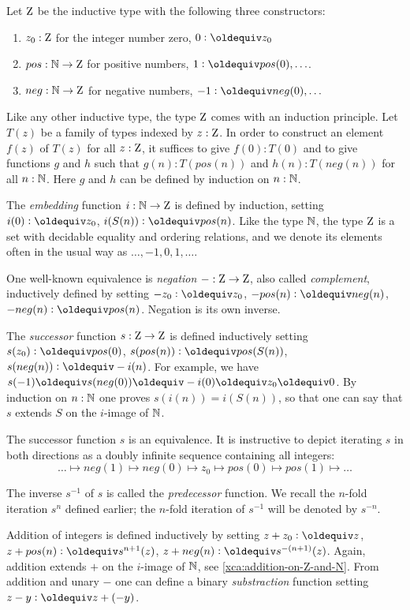 \begin{definition}\label{def:integers}\label{def:zet}
Let $\mathrm{Z}$ be the inductive type with the following three constructors:
\begin{enumerate}
\item $z_0: \mathrm{Z}$ for the integer number zero, 
$0 \defeq z_0$
\item $pos: \mathbb{N} \to \mathrm{Z}$ for positive numbers,
$1 \defeq pos(0),\ldots$.
\item $neg: \mathbb{N} \to \mathrm{Z}$ for negative numbers, 
$-1 \defeq neg(0),\ldots$
\end{enumerate}
Like any other inductive type, the type $\mathrm{Z}$ comes with an
induction principle. Let $T(z)$ be a family of types indexed by $z:\mathrm{Z}$.
In order to construct an element $f(z)$ of $T(z)$ for all $z:\mathrm{Z}$,
it suffices to give $f(0): T(0)$ and to give functions $g$ and $h$ such
that $g(n): T(pos(n))$ and $h(n): T(neg(n))$ for all $n:\mathbb{N}$.
Here $g$ and $h$ can be defined by induction on $n:\mathbb{N}$.

The \emph{embedding} function $i:\mathbb{N}\to\mathrm{Z}$ is defined by induction,
setting $i(0)\defeq z_0$, $i(S(n))\defeq pos(n)$.
Like the type $\mathbb{N}$, the type $\mathrm{Z}$ is a set with decidable equality
and ordering relations,
and we denote its elements often in the usual way as $\ldots,-1,0,1,\ldots$.

One well-known equivalence is \emph{negation} ${-}:\mathrm{Z}\to\mathrm{Z}$, 
also called \emph{complement}, inductively defined by setting 
$-z_0\defeq z_0$, 
$-pos(n)\defeq neg(n)$, 
$-neg(n)\defeq pos(n)$.
Negation is its own inverse.

The \emph{successor} function $s:\mathrm{Z}\to\mathrm{Z}$ is defined inductively setting 
$s(z_0)\defeq pos(0)$, 
$s(pos(n))\defeq pos(S(n))$,
$s(neg(n))\defeq -i(n)$. For example, we have
$s(-1)\jdeq s(neg(0))\jdeq -i(0) \jdeq z_0 \jdeq 0$.
By induction on $n:\mathbb{N}$ one proves $s(i(n))=i(S(n))$, 
so that one can say that $s$ extends $S$
on the $i$-image of $\mathbb{N}$. 

The successor function $s$ is an equivalence.
It is instructive to depict iterating $s$ in both directions as 
a doubly infinite sequence containing all integers:
\[
\ldots \mapsto neg(1) \mapsto neg(0) \mapsto z_0 \mapsto pos(0) \mapsto pos(1) \mapsto \ldots
\]

The inverse $s^{-1}$ of $s$ is called the \emph{predecessor} function.
We recall the $n$-fold iteration $s^n$ defined earlier;
the $n$-fold iteration of $s^{-1}$ will be denoted by $s^{-n}$.

Addition of integers is defined inductively by setting
$z + z_0\defeq z$, 
$z + pos(n)\defeq s^{n+1}(z)$, 
$z + neg(n)\defeq s^{-(n+1)}(z)$.
Again, addition extends $+$ on the $i$-image of $\mathbb{N}$,
see \cref{xca:addition-on-Z-and-N}. 
From addition and unary $-$ one can define a binary
\emph{substraction} function setting $z-y \defeq z+(-y)$.
\end{definition}

